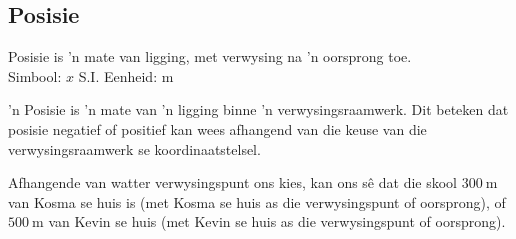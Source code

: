 \subsection*{Posisie}
\nopagebreak

 {Posisie is 'n mate van ligging, met verwysing na 'n oorsprong toe.\\
Simbool: $x$\hspace{2cm} S.I. Eenheid: m} 

 'n Posisie is 'n mate van 'n ligging binne 'n verwysingsraamwerk. Dit beteken dat posisie negatief of positief kan wees afhangend van die keuse van die verwysingsraamwerk se koordinaatstelsel.

Afhangende van watter verwysingspunt ons kies, kan ons s\^e dat die skool $300~\text{m}$ van Kosma se huis is (met Kosma se huis as die verwysingspunt of oorsprong), of $500~\text{m}$ van Kevin se huis (met Kevin se huis as die verwysingspunt of oorsprong).\par
